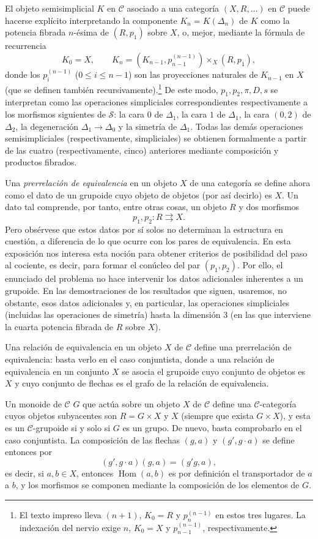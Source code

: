 El objeto semisimplicial $K$ en $\mathcal C$ asociado a una categoría
$(X,R,\ldots)$ en $\mathcal C$ puede hacerse explícito interpretando la
componente $K_n=K(\Delta_n)$ de $K$ como la potencia fibrada $n$-ésima de
$(R,p_1)$ sobre $X$, o, mejor, mediante la fórmula de recurrencia
\[
  K_0=X,\qquad
  K_n=(K_{n-1},p_{n-1}^{(n-1)})\times_X(R,p_1),
\]
donde los $p_i^{(n-1)}$ ($0\leq i\leq n-1$) son las proyecciones naturales de
$K_{n-1}$ en $X$ (que se definen también recursivamente).\footnote{El texto impreso lleva $(n+1)$, $K_0=R$ y $p_n^{(n-1)}$ en estos tres lugares. La indexación del nervio exige $n$, $K_0=X$ y $p_{n-1}^{(n-1)}$, respectivamente.} De este modo,
$p_1,p_2,\pi,D,s$ se interpretan como las operaciones simpliciales
correspondientes respectivamente a los morfismos siguientes de $\mathcal S$:
la cara $0$ de $\Delta_1$, la cara $1$ de $\Delta_1$, la cara $(0,2)$ de
$\Delta_2$, la degeneración $\Delta_1\to\Delta_0$ y la simetría de
$\Delta_1$. Todas las demás operaciones semisimpliciales (respectivamente,
simpliciales) se obtienen formalmente a partir de las cuatro (respectivamente,
cinco) anteriores mediante composición y productos fibrados.

Una \emph{prerrelación de equivalencia} en un objeto $X$ de una categoría se
define ahora como el dato de un grupoide cuyo objeto de objetos (por así
decirlo) es $X$. Un dato tal comprende, por tanto, entre otras cosas, un
objeto $R$ y dos morfismos
\[
  p_1,p_2:R\rightrightarrows X.
\]
Pero obsérvese que estos datos por sí solos no determinan la estructura en
cuestión, a diferencia de lo que ocurre con los pares de equivalencia. En esta
exposición nos interesa esta noción para obtener criterios de posibilidad del
paso al cociente, es decir, para formar el conúcleo del par $(p_1,p_2)$. Por
ello, el enunciado del problema no hace intervenir los datos adicionales
inherentes a un grupoide. En las demostraciones de los resultados que siguen,
usaremos, no obstante, esos datos adicionales y, en particular, las
operaciones simpliciales (incluidas las operaciones de simetría) hasta la
dimensión $3$ (en las que interviene la cuarta potencia fibrada de $R$ sobre
$X$).

Una relación de equivalencia en un objeto $X$ de $\mathcal C$ define una
prerrelación de equivalencia: basta verlo en el caso conjuntista, donde a una
relación de equivalencia en un conjunto $X$ se asocia el grupoide cuyo
conjunto de objetos es $X$ y cuyo conjunto de flechas es el grafo de la
relación de equivalencia.

Un monoide de $\mathcal C$ $G$ que actúa sobre un objeto $X$ de $\mathcal C$
define una $\mathcal C$-categoría cuyos objetos subyacentes son $R=G\times X$
y $X$ (siempre que exista $G\times X$), y esta es un $\mathcal C$-grupoide si
y solo si $G$ es un grupo. De nuevo, basta comprobarlo en el caso conjuntista.
La composición de las flechas $(g,a)$ y $(g',g\cdot a)$ se define entonces por
\[
  (g',g\cdot a)(g,a)=(g'g,a),
\]
es decir, si $a,b\in X$, entonces $\operatorname{Hom}(a,b)$ es por definición
el transportador de $a$ a $b$, y los morfismos se componen mediante la
composición de los elementos de $G$.

